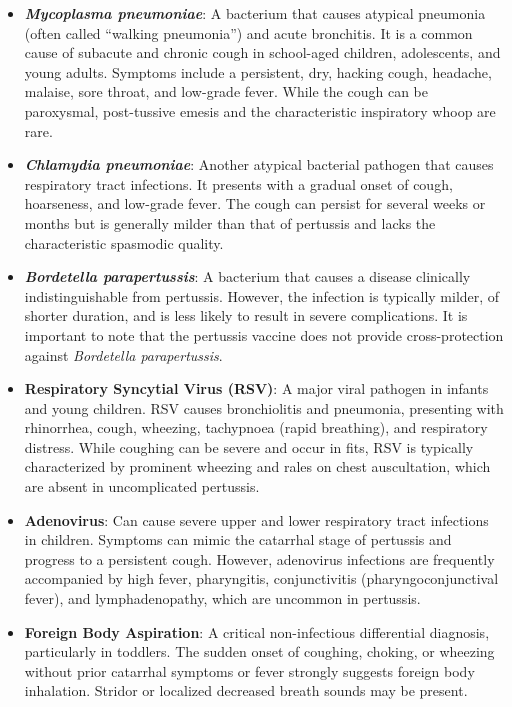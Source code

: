 \begin{itemize}
    \item \textbf{\textit{Mycoplasma pneumoniae}}: A bacterium that causes atypical pneumonia (often called ``walking pneumonia'') and acute bronchitis. It is a common cause of subacute and chronic cough in school-aged children, adolescents, and young adults. Symptoms include a persistent, dry, hacking cough, headache, malaise, sore throat, and low-grade fever. While the cough can be paroxysmal, post-tussive emesis and the characteristic inspiratory whoop are rare.
    \item \textbf{\textit{Chlamydia pneumoniae}}: Another atypical bacterial pathogen that causes respiratory tract infections. It presents with a gradual onset of cough, hoarseness, and low-grade fever. The cough can persist for several weeks or months but is generally milder than that of pertussis and lacks the characteristic spasmodic quality.
    \item \textbf{\textit{Bordetella parapertussis}}: A bacterium that causes a disease clinically indistinguishable from pertussis. However, the infection is typically milder, of shorter duration, and is less likely to result in severe complications. It is important to note that the pertussis vaccine does not provide cross-protection against \textit{Bordetella parapertussis}.
    \item \textbf{Respiratory Syncytial Virus (RSV)}: A major viral pathogen in infants and young children. RSV causes bronchiolitis and pneumonia, presenting with rhinorrhea, cough, wheezing, tachypnoea (rapid breathing), and respiratory distress. While coughing can be severe and occur in fits, RSV is typically characterized by prominent wheezing and rales on chest auscultation, which are absent in uncomplicated pertussis.
    \item \textbf{Adenovirus}: Can cause severe upper and lower respiratory tract infections in children. Symptoms can mimic the catarrhal stage of pertussis and progress to a persistent cough. However, adenovirus infections are frequently accompanied by high fever, pharyngitis, conjunctivitis (pharyngoconjunctival fever), and lymphadenopathy, which are uncommon in pertussis.
    \item \textbf{Foreign Body Aspiration}: A critical non-infectious differential diagnosis, particularly in toddlers. The sudden onset of coughing, choking, or wheezing without prior catarrhal symptoms or fever strongly suggests foreign body inhalation. Stridor or localized decreased breath sounds may be present.

\end{itemize}
